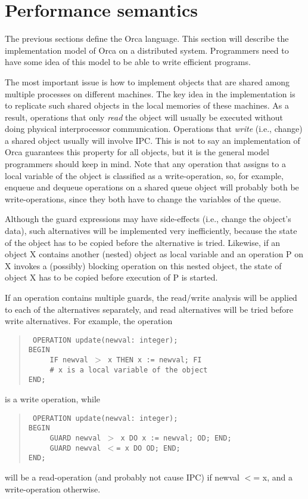\documentclass[10pt]{article}
\begin{document}
\section{Performance semantics}

The previous sections define the Orca language.
This section will describe the implementation model of Orca on
a distributed system.
Programmers need to have some idea of this model to be able to
write efficient programs.

The most important issue is how to implement objects that are shared
among multiple processes on different machines.
The key idea in the implementation is to replicate such
shared objects in the local memories of these machines.
As a result, operations that only {\em read} the object will usually
be executed without doing physical interprocessor communication.
Operations that {\em write} (i.e., change) a shared object usually
will involve IPC.
This is not to say an implementation of Orca guarantees this
property for all objects, but it is the general model programmers should
keep in mind.
Note that any operation that assigns to a local variable of the
object is classified as a write-operation, so, for example,
enqueue and dequeue operations on a shared queue object will probably both
be write-operations, since they both have to change the variables
of the queue.

Although the guard expressions may have side-effects (i.e., change
the object's data), such alternatives will be implemented very inefficiently,
because the state of the object has to be copied before the alternative
is tried.
Likewise, if an object X contains another (nested) object as local variable
and an operation P on X invokes a (possibly) blocking operation on this
nested object, the state of object X has to be copied before execution of P is
started.

If an operation contains multiple guards, the read/write analysis will
be applied to each of the alternatives separately, and read alternatives
will be tried before write alternatives.
For example, the operation 
\begin{quote}\tt
OPERATION update(newval:~integer); \\
BEGIN \\
\mbox{~~~~~}IF newval $>$ x THEN x := newval; FI \\
\mbox{~~~~~}\# x is a local variable of the object \\
END;
\end{quote}
is a write operation, while
\begin{quote}\tt
OPERATION update(newval:~integer); \\
BEGIN \\
\mbox{~~~~~}GUARD newval $>$ x DO x := newval; OD; END; \\
\mbox{~~~~~}GUARD newval $<$= x DO OD; END; \\
END;
\end{quote}
will be a read-operation (and probably not cause IPC) if newval $<$= x, and
a write-operation otherwise.
\end{document}
